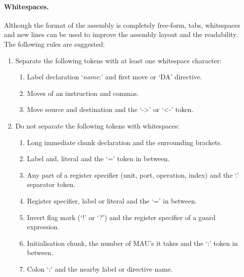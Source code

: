 \documentclass[twoside]{tceusermanual}
\begin{document}
\paragraph{Whitespaces.}
Although the format of the assembly is completely free-form, tabs,
whitespaces and new lines can be used to improve the assembly layout and the
readability. The following rules are suggested:
\begin{enumerate}
\item %
  Separate the following tokens with at least one whitespace character:
  \begin{enumerate}
  \item %
    Label declaration `\emph{name}:' and first move or `DA' directive.
  \item %
    Moves of an instruction and commas.
  \item %
    Move source and destination and the `->' or `<-' token.
  \end{enumerate}
\item %
  Do not separate the following tokens with whitespaces:
  \begin{enumerate}
  \item %
    Long immediate chunk declaration and the surrounding brackets.
  \item %
    Label and, literal and the `=' token in between.
  \item %
    Any part of a register specifier (unit, port, operation, index) and the
    `.' separator token.
  \item %
    Register specifier, label or literal and the `=' in between.
  \item %
    Invert flag mark (`!' or `?') and the register specifier of a guard
    expression.
  \item %
    Initialisation chunk, the number of MAU's it takes and the `:' token in
    between.
  \item %
    Colon `:' and the nearby label or directive name.
  \end{enumerate}
\end{enumerate}
\end{document}
